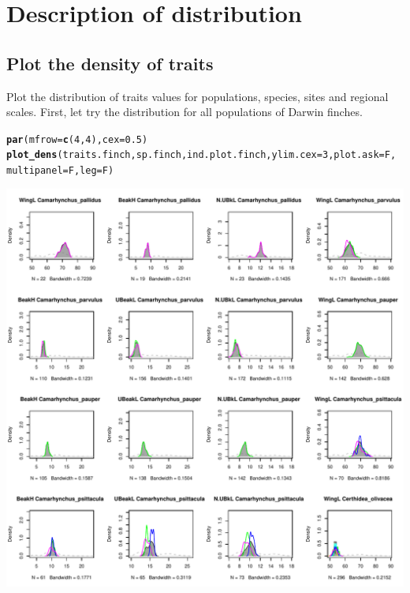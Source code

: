 \documentclass[12pt]{article}\usepackage[]{graphicx}\usepackage[]{color}
\makeatletter
\def\maxwidth{ %
  \ifdim\Gin@nat@width>\linewidth
    \linewidth
  \else
    \Gin@nat@width
  \fi
}
\newcommand{\hlnum}[1]{\textcolor[rgb]{0.686,0.059,0.569}{#1}}%
\newcommand{\hlstd}[1]{\textcolor[rgb]{0.345,0.345,0.345}{#1}}%
\newcommand{\hlkwc}[1]{\textcolor[rgb]{0.333,0.667,0.333}{#1}}%
\newcommand{\hlkwd}[1]{\textcolor[rgb]{0.737,0.353,0.396}{\textbf{#1}}}%
\newenvironment{kframe}{%
 \def\at@end@of@kframe{}%
 \ifinner\ifhmode%
  \def\at@end@of@kframe{\end{minipage}}%
  \begin{minipage}{\columnwidth}%
 \fi\fi%
 \def\FrameCommand##1{\hskip\@totalleftmargin \hskip-\fboxsep
 \colorbox{shadecolor}{##1}\hskip-\fboxsep
     \hskip-\linewidth \hskip-\@totalleftmargin \hskip\columnwidth}%
 \MakeFramed {\advance\hsize-\width
   \@totalleftmargin\z@ \linewidth\hsize
   \@setminipage}}%
 {\par\unskip\endMakeFramed%
 \at@end@of@kframe}
\newenvironment{knitrout}{}{} %
\makeatother
\begin{document}
\newpage


\section{Description of distribution}

\subsection{Plot the density of traits}

Plot the distribution of traits values for populations, species, sites and regional scales. First, let try the distribution for all populations of Darwin finches.

\begin{knitrout}
\color{fgcolor}\begin{kframe}
\begin{alltt}
\hlkwd{par}\hlstd{(}\hlkwc{mfrow} \hlstd{=} \hlkwd{c}\hlstd{(}\hlnum{4}\hlstd{,} \hlnum{4}\hlstd{),} \hlkwc{cex} \hlstd{=} \hlnum{0.5}\hlstd{)}
\hlkwd{plot_dens}\hlstd{(traits.finch, sp.finch, ind.plot.finch,} \hlkwc{ylim.cex} \hlstd{=} \hlnum{3}\hlstd{,} \hlkwc{plot.ask} \hlstd{= F,}
    \hlkwc{multipanel} \hlstd{= F,} \hlkwc{leg} \hlstd{= F)}
\end{alltt}
\end{kframe}
\includegraphics[width=\maxwidth]{figure/unnamed-chunk-41} 


\end{knitrout}
\end{document}
